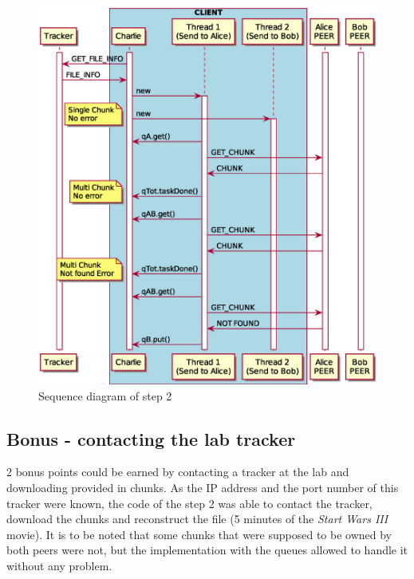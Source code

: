 \begin{figure}
	\centering
	\includegraphics[width=\textwidth]{img/step2.eps}
	\caption{Sequence diagram of step 2}
	\label{fig:step2}
\end{figure}

\subsection{Bonus - contacting the lab tracker}

2 bonus points could be earned by contacting a tracker at the lab and downloading provided in chunks. As the IP address and the port number of this tracker were known, the code of the step 2 was able to contact the tracker, download the chunks and reconstruct the file (5 minutes of the \textit{Start Wars III} movie). It is to be noted that some chunks that were supposed to be owned by both peers were not, but the implementation with the queues allowed to handle it without any problem.